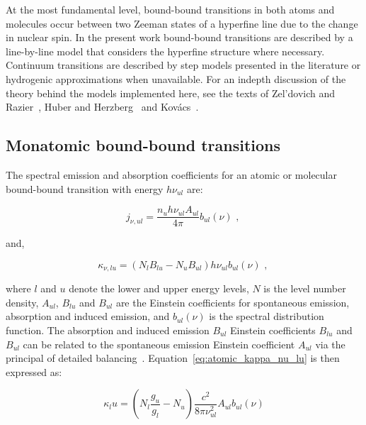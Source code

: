 \par

At the most fundamental level, bound-bound transitions in both atoms and molecules occur between two Zeeman states of a hyperfine line due to the change in nuclear spin.
In the present work bound-bound transitions are described by a line-by-line model that considers the hyperfine structure where necessary.
Continuum transitions are described by step models presented in the literature or hydrogenic approximations when unavailable.
For an indepth discussion of the theory behind the models implemented here, see the texts of Zel'dovich and Razier~\cite{ZR}, Huber and Herzberg~\cite{HH_1979} and Kov\'{a}cs~\cite{kovacs69}.

\subsection{Monatomic bound-bound transitions}
\label{sec:monatomic_transitions}


The spectral emission and absorption coefficients for an atomic or molecular bound-bound transition with energy $h \nu_{u l}$ are:

\begin{equation}
 j_{\nu,ul} = \frac{n_{u} h \nu_{u l} A_{u l}}{4 \pi} b_{ul}(\nu) \text{ , } \label{eq:atomic_j_nu_ul}
\end{equation}

\noindent and,

\begin{equation}
 \kappa_{\nu,lu} = ( N_{l} B_{l u} -N_{u} B_{u l} ) h \nu_{u l} b_{ul}(\nu) \text{ , } \label{eq:atomic_kappa_nu_lu}
\end{equation}

\noindent where $l$ and $u$ denote the lower and upper energy levels, $N$ is the level number density, $A_{ul}$, $B_{lu}$ and $B_{ul}$ are the Einstein coefficients for spontaneous emission, absorption and induced emission, and $b_{ul}(\nu)$ is the spectral distribution function.
The absorption and induced emission $B_{ul}$ Einstein coefficients $B_{lu}$ and $B_{ul}$ can be related to the spontaneous emission Einstein coefficient $A_{ul}$ via the principal of detailed balancing~\cite{ZR}.
Equation~\ref{eq:atomic_kappa_nu_lu} is then expressed as:

\begin{equation}
 \kappa_lu = \left ( N_l \frac{g_u}{g_l} - N_u \right ) \frac{c^2}{8 \pi \nu_{ul}^2} A_{ul} b_{ul}(\nu)
\end{equation}

